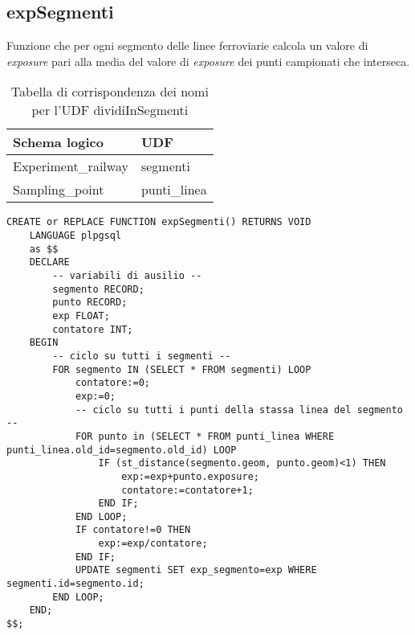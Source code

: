 \subsection{expSegmenti}
Funzione che per ogni segmento delle linee ferroviarie calcola un valore di \textit{exposure} pari alla media del valore di \textit{exposure} dei punti campionati che interseca.\\

\begin{table}[h]
\centering
\caption{Tabella di corrispondenza dei nomi per l'UDF dividiInSegmenti}
\label{mapTb6}
\begin{tabular}{|l|l|}
\hline
Schema logico       & UDF                \\ \hline
Experiment\_railway          & segmenti              \\ 
Sampling\_point          & punti\_linea              \\ \hline
\end{tabular}
\end{table}

\begin{lstlisting}[style=mySQL]
CREATE or REPLACE FUNCTION expSegmenti() RETURNS VOID
	LANGUAGE plpgsql
	as $$
	DECLARE
		-- variabili di ausilio --
		segmento RECORD;
		punto RECORD;
		exp FLOAT;
		contatore INT;
	BEGIN
		-- ciclo su tutti i segmenti --
		FOR segmento IN (SELECT * FROM segmenti) LOOP
			contatore:=0;
			exp:=0;
			-- ciclo su tutti i punti della stassa linea del segmento --
			FOR punto in (SELECT * FROM punti_linea WHERE punti_linea.old_id=segmento.old_id) LOOP
				IF (st_distance(segmento.geom, punto.geom)<1) THEN
					exp:=exp+punto.exposure;
					contatore:=contatore+1;
				END IF;
			END LOOP;
			IF contatore!=0 THEN
				exp:=exp/contatore;
			END IF;
			UPDATE segmenti SET exp_segmento=exp WHERE segmenti.id=segmento.id;
		END LOOP;
	END;
$$;
\end{lstlisting}